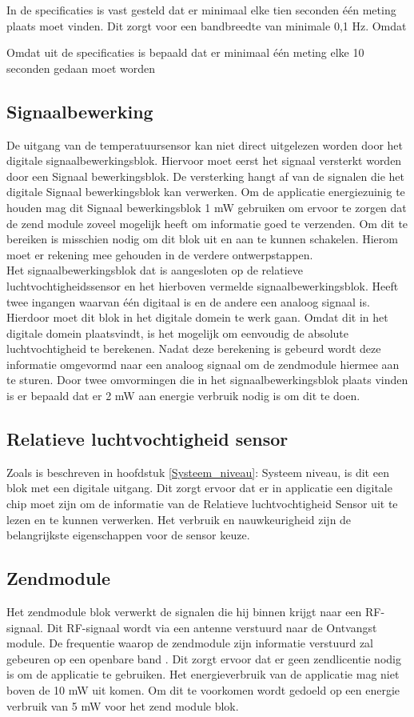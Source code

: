 In de specificaties is vast gesteld dat er minimaal elke tien seconden één meting plaats moet vinden. Dit zorgt voor een bandbreedte van minimale 0,1 Hz. Omdat


Omdat uit de specificaties is bepaald dat er minimaal één meting elke 10 seconden gedaan moet worden 

\subsection{Signaalbewerking}
De uitgang van de temperatuursensor kan niet direct uitgelezen worden door het digitale signaalbewerkingsblok. Hiervoor moet eerst het signaal versterkt worden door een Signaal bewerkingsblok. De versterking hangt af van de signalen die het digitale Signaal bewerkingsblok kan verwerken. Om de applicatie energiezuinig te houden mag dit Signaal bewerkingsblok 1 mW gebruiken om ervoor te zorgen dat de zend module zoveel mogelijk heeft om informatie goed te verzenden. Om dit te bereiken is misschien nodig om dit blok uit en aan te kunnen schakelen. Hierom moet er rekening mee gehouden in de verdere ontwerpstappen.
\\
\newline
Het signaalbewerkingsblok dat is aangesloten op de relatieve luchtvochtigheidssensor en het hierboven vermelde signaalbewerkingsblok. Heeft twee ingangen waarvan één digitaal is en de andere een analoog signaal is. Hierdoor moet dit blok in het digitale domein te werk gaan. Omdat dit in het digitale domein plaatsvindt, is het mogelijk om eenvoudig de absolute luchtvochtigheid te berekenen. Nadat deze berekening is gebeurd wordt deze informatie omgevormd naar een analoog signaal om de zendmodule hiermee aan te sturen. Door twee omvormingen die in het signaalbewerkingsblok plaats vinden is er bepaald dat er 2 mW aan energie verbruik nodig is om dit te doen.

\subsection{Relatieve luchtvochtigheid sensor} 
Zoals is beschreven in hoofdstuk \ref{Systeem_niveau}: Systeem niveau, is dit een blok met een digitale uitgang. Dit zorgt ervoor dat er in applicatie een digitale chip moet zijn om de informatie van de Relatieve luchtvochtigheid Sensor uit te lezen en te kunnen verwerken. Het verbruik en nauwkeurigheid zijn de belangrijkste eigenschappen voor de sensor keuze.

\subsection{Zendmodule}
Het zendmodule blok verwerkt de signalen die hij binnen krijgt naar een RF-signaal. Dit RF-signaal wordt via een antenne verstuurd naar de Ontvangst module. De frequentie waarop de zendmodule zijn informatie verstuurd zal gebeuren op een openbare band \cite{RF_banden}. Dit zorgt ervoor dat er geen zendlicentie nodig is om de applicatie te gebruiken. Het energieverbruik van de applicatie mag niet boven de 10 mW uit komen. Om dit te voorkomen wordt gedoeld op een energie verbruik van 5 mW voor het zend module blok.

